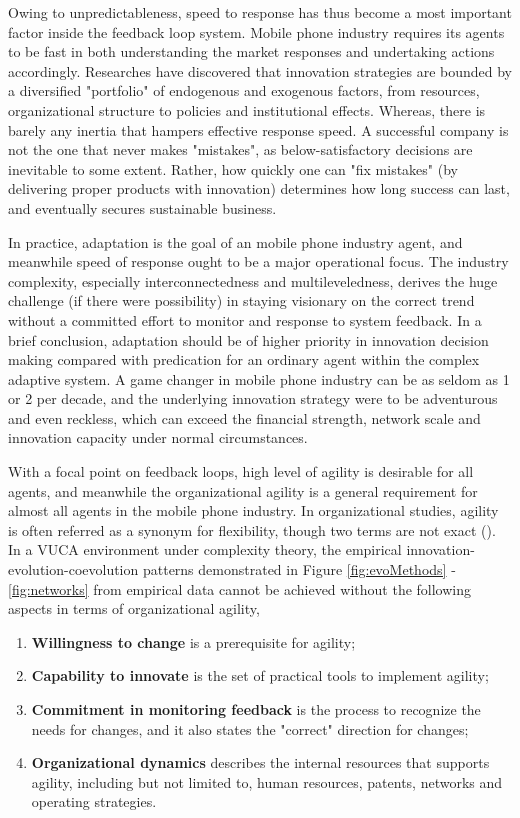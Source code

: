 \documentclass[utf8,english]{gradu3}
\begin{document}
Owing to unpredictableness, speed to response has thus become a most important factor inside the feedback loop system. Mobile phone industry requires its agents to be fast in both understanding the market responses and undertaking actions accordingly. Researches have discovered that innovation strategies are bounded by a diversified "portfolio" of endogenous and exogenous factors, from resources, organizational structure to policies and institutional effects. Whereas, there is barely any inertia that hampers effective response speed. A successful company is not the one that never makes "mistakes", as below-satisfactory decisions are  inevitable to some extent. Rather, how quickly one can "fix mistakes" (by delivering proper products with innovation) determines how long success can last, and eventually secures sustainable business.

In practice, adaptation is the goal of an mobile phone industry agent, and meanwhile speed of response ought to be a major operational focus. The industry complexity, especially interconnectedness and multileveledness, derives the huge challenge (if there were possibility) in staying visionary on the correct trend without a committed effort to monitor and response to system feedback. In a brief conclusion, adaptation should be of higher priority in innovation decision making compared with predication for an ordinary agent within the complex adaptive system. A game changer in mobile phone industry can be as seldom as 1 or 2 per decade, and the underlying innovation strategy were to be adventurous and even reckless, which can exceed the financial strength, network scale and innovation capacity under normal circumstances.

With a focal point on feedback loops, high level of agility is desirable for all agents, and meanwhile the organizational agility is a general requirement for almost all agents in the mobile phone industry. In organizational studies, agility is often referred as a synonym for flexibility, though two terms are not exact (\cite{teece2016dynamic}). In a VUCA environment under complexity theory, the empirical innovation-evolution-coevolution patterns demonstrated in Figure \ref{fig:evoMethods} - \ref{fig:networks} from empirical data cannot be achieved without the following aspects in terms of organizational agility,

\begin{enumerate}
\item \textbf{Willingness to change} is a prerequisite for agility; 
\item \textbf{Capability to innovate} is the set of practical tools to implement agility;
\item \textbf{Commitment in monitoring feedback} is the process to recognize the needs for changes, and it also states the "correct" direction for changes;
\item \textbf{Organizational dynamics} describes the internal resources that supports agility, including but not limited to, human resources, patents, networks and operating strategies. 
\end{enumerate}
\end{document}
